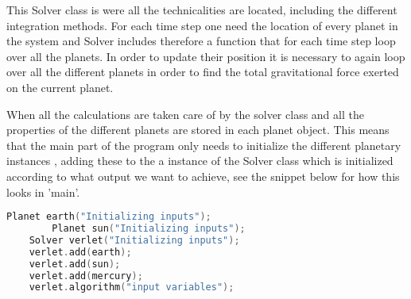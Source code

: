 This Solver class is were all the technicalities are located, including the different integration methods. For each time step one need the location of every planet in the system and Solver includes therefore a function that for each time step loop over all the planets. In order to update their position it is necessary to again loop over all the different planets in order to find the total gravitational force exerted on the current planet.  

When all the calculations are taken care of by the solver class and all the properties of the different planets are stored in each planet object. This means that the main part of the program only needs to initialize the different planetary instances , adding these to the a instance of the Solver class which is initialized according to what output we want to achieve, see the snippet below for how this looks in 'main'. 
 
\begin{lstlisting}[language=C++]
	Planet earth("Initializing inputs");
		Planet sun("Initializing inputs");
	Solver verlet("Initializing inputs");
	verlet.add(earth);
	verlet.add(sun);
	verlet.add(mercury);
	verlet.algorithm("input variables");
\end{lstlisting}

